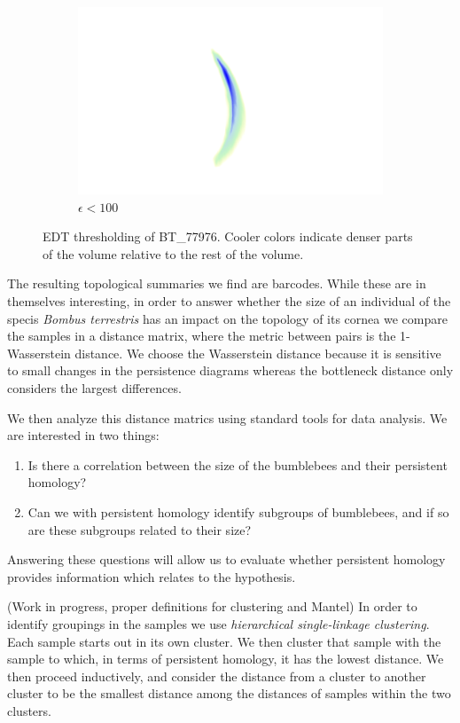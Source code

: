 \begin{figure}[ht]
\begin{subfigure}{.3 \linewidth}
  \includegraphics[scale=0.2]{eps100.png}
  \caption{$\epsilon < 100$}
  \end{subfigure}
  \caption{\label{thresh} EDT thresholding of BT\_77976. Cooler colors indicate denser parts of the volume relative to the rest of the volume.}
\end{figure}
The resulting topological summaries we find are barcodes. While these are in themselves interesting, in order to answer whether the size of an individual of the specis \textit{Bombus terrestris} has an impact on the topology of its cornea we compare the samples in a distance matrix, where the metric between pairs is the 1-Wasserstein distance. We choose the Wasserstein distance because it is sensitive to small changes in the persistence diagrams whereas the bottleneck distance only considers the largest differences.

We then analyze this distance matrics using standard tools for data analysis. We are interested in two things:
\begin{enumerate}
  \item Is there a correlation between the size of the bumblebees and their persistent homology?
  \item Can we with persistent homology identify subgroups of bumblebees, and if so are these subgroups related to their size?
\end{enumerate}
Answering these questions will allow us to evaluate whether persistent homology provides information which relates to the hypothesis.

(Work in progress, proper definitions for clustering and Mantel)
In order to identify groupings in the samples we use \textit{hierarchical single-linkage clustering}. Each sample starts out in its own cluster. We then cluster that sample with the sample to which, in terms of persistent homology, it has the lowest distance. We then proceed inductively, and consider the distance from a cluster to another cluster to be the smallest distance among the distances of samples within the two clusters.

